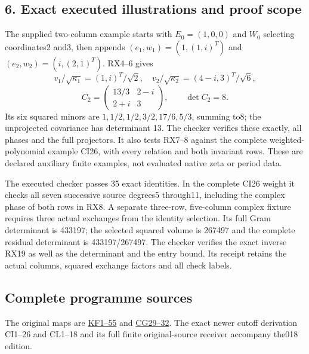 \documentclass[11pt]{article}
\begin{document}
\subsection{6. Exact executed illustrations and proof scope}\label{exact-executed-illustrations-and-proof-scope}

The supplied two-column example starts with \(E_0=(1,0,0)\) and \(W_0\) selecting coordinates2 and3, then appends \((e_1,w_1)=(1,(1,i)^T)\) and \((e_2,w_2)=(i,(2,1)^T)\). RX4--6 gives \[
v_1/\sqrt{\kappa_1}=(1,i)^T/\sqrt2,
\quad v_2/\sqrt{\kappa_2}=(4-i,3)^T/\sqrt6,
\] \[
C_2=\begin{pmatrix}13/3&2-i\\2+i&3\end{pmatrix},\qquad\det C_2=8.
\tag{RX20}
\] Its six squared minors are \(1,1/2,1/2,3/2,17/6,5/3\), summing to8; the unprojected covariance has determinant 13. The checker verifies these exactly, all phases and the full projectors. It also tests RX7--8 against the complete weighted-polynomial example CI26, with every relation and both invariant rows. These are declared auxiliary finite examples, not evaluated native zeta or period data.

The executed checker passes 35 exact identities. In the complete CI26 weight it checks all seven successive source degrees5 through11, including the complex phase of both rows in RX8. A separate three-row, five-column complex fixture requires three actual exchanges from the identity selection. Its full Gram determinant is 433197; the selected squared volume is 267497 and the complete residual determinant is 433197/267497. The checker verifies the exact inverse RX19 as well as the determinant and the entry bound. Its receipt retains the actual columns, squared exchange factors and all check labels.

\subsection{Complete programme sources}\label{complete-programme-sources}

The original maps are \href{https://github.com/KokunoYumeto/zeta-function-research-reader/blob/0fd693c844aad9117e30ec447c59864a28af10f3/workbenches/splitzero-tandem/continuations/20260921-native-spectral-real-pair/003/ACTUAL_KERNEL_FILTRATION_AND_GRAPH.tex}{KF1--55} and \href{https://github.com/KokunoYumeto/zeta-function-research-reader/blob/0fd693c844aad9117e30ec447c59864a28af10f3/workbenches/splitzero-tandem/continuations/20260921-native-spectral-real-pair/003/COMPLETE_CONDUCTOR_GRAPH_METRIC.tex\#L224}{CG29--32}. The exact newer cutoff derivation CI1--26 and CL1--18 and its full finite original-source receiver accompany the018 edition.
\end{document}
